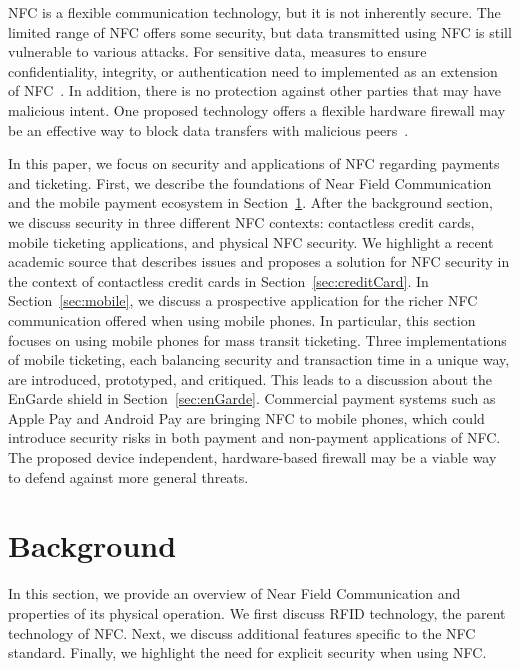 \documentclass{sig-alternate}
\begin{document}
NFC is a flexible communication technology, but it is not inherently secure. The limited range of NFC offers some security, but data transmitted using NFC is still vulnerable to various attacks. For sensitive data, measures to ensure confidentiality, integrity, or authentication need to implemented as an extension of NFC~\cite{CC2016}. In addition, there is no protection against other parties that may have malicious intent. One proposed technology offers a flexible hardware firewall may be an effective way to block data transfers with malicious peers~\cite{Gum2013}.

In this paper, we focus on security and applications of NFC regarding payments and ticketing. First, we describe the foundations of Near Field Communication and the mobile payment ecosystem in Section~\ref{sec:background}. After the background section, we discuss security in three different NFC contexts: contactless credit cards, mobile ticketing applications, and physical NFC security. 
We highlight a recent academic source that describes issues and proposes a solution for NFC security in the context of contactless credit cards in Section~\ref{sec:creditCard}. 
In Section~\ref{sec:mobile}, we discuss a prospective application for the richer NFC communication offered when using mobile phones. In particular, this section focuses on  using mobile phones for mass transit ticketing. Three implementations of mobile ticketing, each balancing security and transaction time in a unique way, are introduced, prototyped, and critiqued.
This leads to a discussion about the EnGarde shield in Section~\ref{sec:enGarde}. Commercial payment systems such as Apple Pay and Android Pay are bringing NFC to mobile phones, which could introduce security risks in both payment and non-payment applications of NFC. The proposed device independent, hardware-based firewall may be a viable way to defend against more general threats.


\section{Background}
\label{sec:background}
In this section, we provide an overview of Near Field Communication and properties of its physical operation.  We first discuss RFID technology, the parent technology of NFC. Next, we discuss additional features specific to the NFC standard. 
Finally, we highlight the need for explicit security when using NFC.
\end{document}
